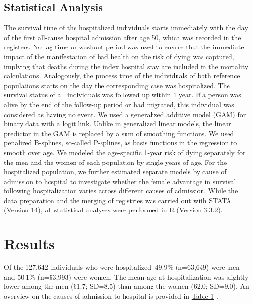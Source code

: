 \subsection{Statistical Analysis}
The survival time of the hospitalized individuals starts immediately 
with the day of the first all-cause hospital admission after age 50, 
which was recorded in the registers. No lag time or washout period 
was used to ensure that the immediate impact of the manifestation of 
bad health on the risk of dying was captured, implying that deaths 
during the index hospital stay are included in the mortality calculations. 
Analogously, the process time of the individuals of both reference 
populations starts on the day the corresponding case was hospitalized. 
The survival status of all individuals was followed up within 1 year. 
If a person was alive by the end of the follow-up period or had migrated, 
this individual was considered as having no event. We used a generalized 
additive model (GAM) for binary data with a logit link. Unlike in 
generalized linear models, the linear predictor in the GAM is replaced 
by a sum of smoothing functions.\citep{hastie1986generalized,hastie1995generalized} 
We used penalized B-splines, so-called P-splines, as basis functions 
in the regression to smooth over age.\citep{wood2006generalized,
eilers1996flexible} We modeled the age-specific 1-year risk of dying 
separately for the men and the women of each population by single years 
of age. For the hospitalized population, we further estimated separate 
models by cause of admission to hospital to investigate whether the 
female advantage in survival following hospitalization varies across 
different causes of admission. While the data preparation and the merging 
of registries was carried out with STATA (Version 14), all statistical 
analyses were performed in R (Version 3.3.2).\\

\section{Results}
Of the 127,642 individuals who were hospitalized, 49.9\% (n=63,649) were 
men and 50.1\% (n=63,993) were women. The mean age at hospitalization was 
slightly lower among the men (61.7; SD=8.5) than among the women (62.0; 
SD=9.0). An overview on the causes of admission to hospital is provided 
in \hyperref[ch2:tab1]{Table 1} .

